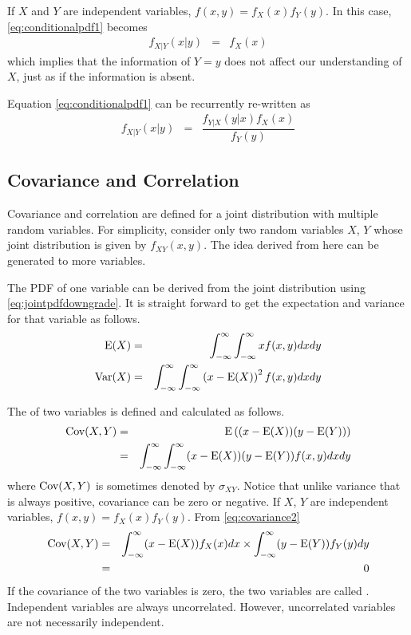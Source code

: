 If $X$ and $Y$ are independent variables, $f(x,y) = f_X(x)f_Y(y)$. In this case, \eqref{eq:conditionalpdf1} becomes
\begin{eqnarray}
  f_{X|Y}(x|y) &=& f_X(x) \nonumber
\end{eqnarray}
which implies that the information of $Y=y$ does not affect our understanding of $X$, just as if the information is absent.

Equation \eqref{eq:conditionalpdf1} can be recurrently re-written as
\begin{eqnarray}
f_{X|Y}(x|y) &=& \dfrac{f_{Y|X}(y|x)f_X(x)}{f_Y(y)} \label{eq:conditionalpdf1a}
\end{eqnarray}


\subsection{Covariance and Correlation}

Covariance and correlation are defined for a joint distribution with multiple random variables. For simplicity, consider only two random variables $X$, $Y$ whose joint distribution is given by $f_{XY}(x, y)$. The idea derived from here can be generated to more variables.

The PDF of one variable can be derived from the joint distribution using \eqref{eq:jointpdfdowngrade}. It is straight forward to get the expectation and variance for that variable as follows.
\begin{eqnarray}
	\textup{E}(X) &=& \int_{-\infty}^{\infty}\int_{-\infty}^{\infty}xf(x, y)dxdy \nonumber \\
	\textup{Var}(X) &=& \int_{-\infty}^{\infty}\int_{-\infty}^{\infty}\left(x-\textup{E}(X)\right)^2f(x, y)dxdy \nonumber
\end{eqnarray}

The  of two variables is defined and calculated as follows.
\begin{eqnarray}
	\textup{Cov}(X, Y) &=& \textup{E}\left((x - \textup{E}(X))(y - \textup{E}(Y))\right) \label{eq:covariance1} \\
	&=& \int_{-\infty}^{\infty}\int_{-\infty}^{\infty}(x - \textup{E}(X))(y - \textup{E}(Y))f(x, y)dxdy \label{eq:covariance2}
\end{eqnarray}
where $\textup{Cov}(X, Y)$ is sometimes denoted by $\sigma_{XY}$. Notice that unlike variance that is always positive, covariance can be zero or negative. If $X$, $Y$ are independent variables, $f(x,y) = f_X(x)f_Y(y)$. From \eqref{eq:covariance2}
\begin{eqnarray}
	\textup{Cov}(X, Y) &=& \int_{-\infty}^{\infty}(x - \textup{E}(X))f_X(x)dx \times \int_{-\infty}^{\infty}(y - \textup{E}(Y))f_Y(y)dy \nonumber \\
	&=& 0 \nonumber
\end{eqnarray}
If the covariance of the two variables is zero, the two variables are called . Independent variables are always uncorrelated. However, uncorrelated variables are not necessarily independent.

